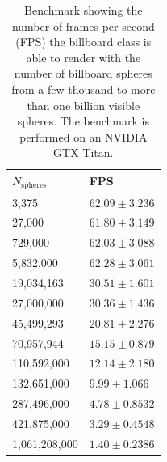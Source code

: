 \begin{table}[h]
\begin{center}
    \begin{tabular}{|l|l|}
    \hline
    $N_\text{spheres}$ & FPS\\ \hline
    3,375      & $62.09 \pm 3.236$\\
    \hline
    27,000     & $61.80 \pm 3.149$\\
    \hline
    729,000    & $62.03 \pm 3.088$\\
    \hline
    5,832,000   & $62.28 \pm 3.061$\\
    \hline
    19,034,163  & $30.51 \pm 1.601$\\
    \hline
    27,000,000  & $30.36 \pm 1.436$\\
    \hline
    45,499,293  & $20.81 \pm 2.276$\\
    \hline
    70,957,944  & $15.15 \pm 0.879$\\
    \hline
    110,592,000 & $12.14 \pm 2.180$\\
    \hline
    132,651,000 & $9.99 \pm 1.066$\\
    \hline
    287,496,000 & $4.78 \pm 0.8532$\\
    \hline
    421,875,000 & $3.29 \pm 0.4548$\\
    \hline
    1,061,208,000 & $1.40 \pm 0.2386$\\
    \hline
    \end{tabular}
    \caption{Benchmark showing the number of frames per second (FPS) the billboard class is able to render with the number of billboard spheres from a few thousand to more than one billion visible spheres. The benchmark is performed on an NVIDIA GTX Titan.}
    \label{tab:vis_fps_scaling}
    \end{center}
\end{table}


